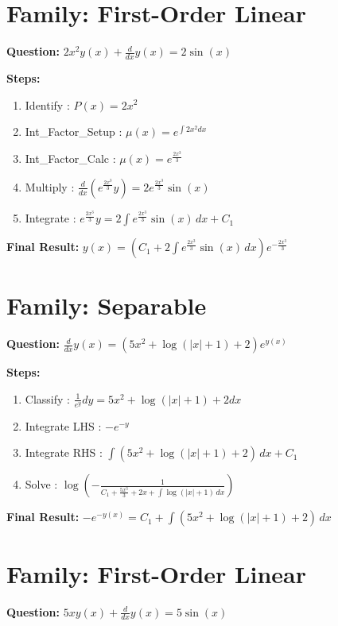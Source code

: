 \documentclass{article}
\begin{document}
\section*{Family: First-Order Linear}
\textbf{Question:} $2 x^{2} y{\left(x \right)} + \frac{d}{d x} y{\left(x \right)} = 2 \sin{\left(x \right)}$

\textbf{Steps:}
\begin{enumerate}
\item Identify :  $P(x) = 2 x^{2}$
\item Int_Factor_Setup :  $\mu(x) = e^{\int 2 x^{2} dx}$
\item Int_Factor_Calc :  $\mu(x) = e^{\frac{2 x^{3}}{3}}$
\item Multiply :  $\frac{d}{dx}(e^{\frac{2 x^{3}}{3}}y) = 2 e^{\frac{2 x^{3}}{3}} \sin{\left(x \right)}$
\item Integrate :  $e^{\frac{2 x^{3}}{3}}y = 2 \int e^{\frac{2 x^{3}}{3}} \sin{\left(x \right)}\, dx + C_1$
\end{enumerate}
\textbf{Final Result:} $y{\left(x \right)} = \left(C_{1} + 2 \int e^{\frac{2 x^{3}}{3}} \sin{\left(x \right)}\, dx\right) e^{- \frac{2 x^{3}}{3}}$

\section*{Family: Separable}
\textbf{Question:} $\frac{d}{d x} y{\left(x \right)} = \left(5 x^{2} + \log{\left(\left|{x}\right| + 1 \right)} + 2\right) e^{y{\left(x \right)}}$

\textbf{Steps:}
\begin{enumerate}
\item Classify :  $\frac{1}{e^{y}} dy = 5 x^{2} + \log{\left(\left|{x}\right| + 1 \right)} + 2 dx$
\item Integrate LHS :  $- e^{- y}$
\item Integrate RHS :  $\int \left(5 x^{2} + \log{\left(\left|{x}\right| + 1 \right)} + 2\right)\, dx + C_1$
\item Solve :  $\log{\left(- \frac{1}{C_{1} + \frac{5 x^{3}}{3} + 2 x + \int \log{\left(\left|{x}\right| + 1 \right)}\, dx} \right)}$
\end{enumerate}
\textbf{Final Result:} $- e^{- y{\left(x \right)}} = C_{1} + \int \left(5 x^{2} + \log{\left(\left|{x}\right| + 1 \right)} + 2\right)\, dx$

\section*{Family: First-Order Linear}
\textbf{Question:} $5 x y{\left(x \right)} + \frac{d}{d x} y{\left(x \right)} = 5 \sin{\left(x \right)}$
\end{document}

